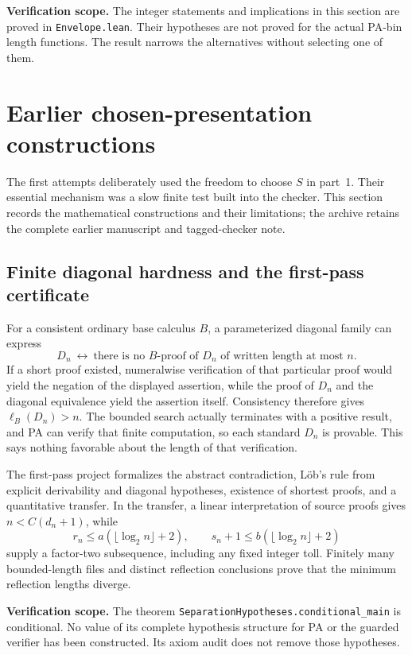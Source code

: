 \documentclass[11pt]{article}
\theoremstyle{definition}
\theoremstyle{remark}
\newcommand{\status}[1]{\par\smallskip\noindent\textbf{Verification scope.} #1\par\smallskip}
\begin{document}
\status{The integer statements and implications in this section are proved
in \texttt{Envelope.lean}. Their hypotheses are not proved for the actual
PA-bin length functions. The result narrows the alternatives without selecting
one of them.}

\section{Earlier chosen-presentation constructions}
\label{sec:early}

The first attempts deliberately used the freedom to choose $S$ in part~1.
Their essential mechanism was a slow finite test built into the checker.
This section records the mathematical constructions and their limitations;
the archive retains the complete earlier manuscript and tagged-checker note.

\subsection{Finite diagonal hardness and the first-pass certificate}
For a consistent ordinary base calculus $B$, a parameterized diagonal family
can express
\[
 D_n\ \longleftrightarrow\
 \text{there is no $B$-proof of $D_n$ of written length at most $n$}.
\]
If a short proof existed, numeralwise verification of that particular proof
would yield the negation of the displayed assertion, while the proof of
$D_n$ and the diagonal equivalence yield the assertion itself. Consistency
therefore gives $\ell_B(D_n)>n$. The bounded search actually terminates with
a positive result, and PA can verify that finite computation, so each
standard $D_n$ is provable. This says nothing favorable about the length of
that verification.

The first-pass project formalizes the abstract contradiction, L\"ob's rule
from explicit derivability and diagonal hypotheses, existence of shortest
proofs, and a quantitative transfer. In the transfer, a linear interpretation
of source proofs gives $n<C(d_n+1)$, while
\[
 r_n\le a(\lfloor\log_2 n\rfloor+2),\qquad
 s_n+1\le b(\lfloor\log_2 n\rfloor+2)
\]
supply a factor-two subsequence, including any fixed integer toll. Finitely
many bounded-length files and distinct reflection conclusions prove that
the minimum reflection lengths diverge.

\status{The theorem \texttt{SeparationHypotheses.conditional\_main} is
conditional. No value of its complete hypothesis structure for PA or the
guarded verifier has been constructed. Its axiom audit does not remove those
hypotheses.}
\end{document}
